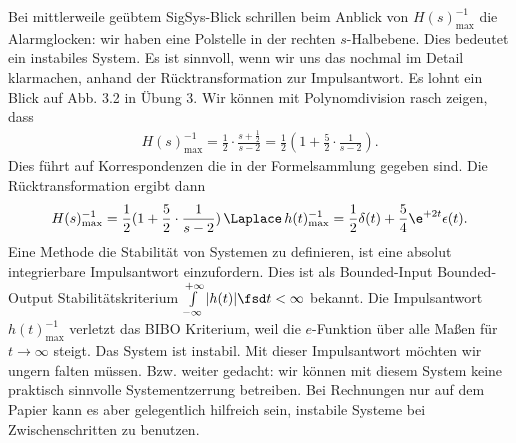 \begin{ExCalc}
Bei mittlerweile geübtem SigSys-Blick schrillen beim Anblick von
$H(s)_\mathrm{max}^{-1}$
die Alarmglocken: wir haben eine Polstelle in der rechten $s$-Halbebene.
Dies bedeutet ein instabiles System.
Es ist sinnvoll, wenn wir uns das nochmal im Detail klarmachen, anhand der
Rücktransformation zur Impulsantwort.
Es lohnt ein Blick auf Abb. 3.2 in Übung 3.
%
Wir können mit Polynomdivision rasch zeigen, dass
\begin{align}
H(s)_\mathrm{max}^{-1} = \frac{1}{2}\cdot\frac{s+\frac{1}{2}}{s-2}
= \frac{1}{2} ( 1 + \frac{5}{2}\cdot\frac{1}{s-2}).
\end{align}
Dies führt auf Korrespondenzen die in der Formelsammlung gegeben
sind.
Die Rücktransformation ergibt dann
\begin{align}
H(s)_\mathrm{max}^{-1} = \frac{1}{2} ( 1 + \frac{5}{2}\cdot\frac{1}{s-2})
\,\Laplace\,
h(t)_\mathrm{max}^{-1} = \frac{1}{2}\delta(t) + \frac{5}{4}\e^{+2 t}\epsilon(t).
\end{align}
%
Eine Methode die Stabilität von Systemen zu definieren, ist eine absolut
integrierbare Impulsantwort einzufordern. Dies ist als Bounded-Input Bounded-Output
Stabilitätskriterium
$\int\limits_{-\infty}^{+\infty} |h(t)|\fsd t < \infty$
bekannt.
Die Impulsantwort $h(t)_\mathrm{max}^{-1} $ verletzt das BIBO Kriterium, weil
die $e$-Funktion über alle Maßen für $t\to\infty$ steigt. Das System ist
instabil.
Mit dieser Impulsantwort möchten wir ungern falten müssen.
Bzw. weiter gedacht: wir können mit diesem System keine praktisch sinnvolle
Systementzerrung betreiben.
%
Bei Rechnungen nur auf dem Papier kann es aber gelegentlich hilfreich sein,
instabile Systeme bei Zwischenschritten zu benutzen.
\end{ExCalc}

